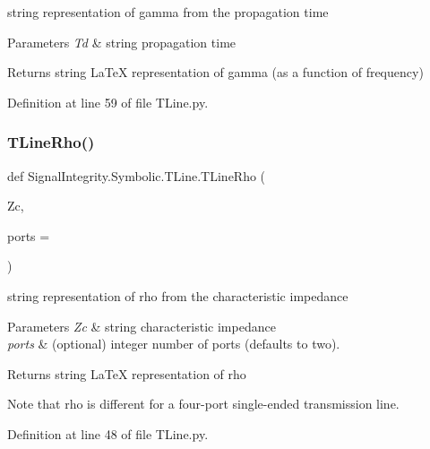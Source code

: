 string representation of gamma from the propagation time 


\begin{DoxyParams}{Parameters}
{\em Td} & string propagation time \\
\hline
\end{DoxyParams}
\begin{DoxyReturn}{Returns}
string La\+TeX representation of gamma (as a function of frequency) 
\end{DoxyReturn}


Definition at line 59 of file T\+Line.\+py.

\mbox{\label{namespaceSignalIntegrity_1_1Symbolic_1_1TLine_a6e67758dfbb8c37100cd86a52783b20c}} 
\subsubsection{\texorpdfstring{T\+Line\+Rho()}{TLineRho()}}
{\footnotesize\ttfamily def Signal\+Integrity.\+Symbolic.\+T\+Line.\+T\+Line\+Rho (\begin{DoxyParamCaption}\item[{}]{Zc,  }\item[{}]{ports = {} }\end{DoxyParamCaption})}



string representation of rho from the characteristic impedance 


\begin{DoxyParams}{Parameters}
{\em Zc} & string characteristic impedance \\
\hline
{\em ports} & (optional) integer number of ports (defaults to two). \\
\hline
\end{DoxyParams}
\begin{DoxyReturn}{Returns}
string La\+TeX representation of rho 
\end{DoxyReturn}
\begin{DoxyNote}{Note}
that rho is different for a four-\/port single-\/ended transmission line. 
\end{DoxyNote}


Definition at line 48 of file T\+Line.\+py.

